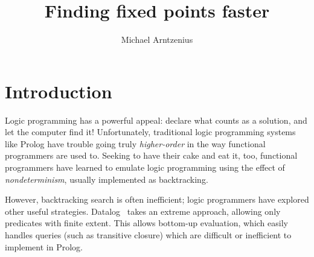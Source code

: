 \documentclass[sigplan,screen,review,timestamp,dvipsnames]{acmart}
\title{Finding fixed points faster}
\author{Michael Arntzenius}
\affiliation{University of Birmingham}
\begin{document}



\maketitle

\section{Introduction}
Logic programming has a powerful appeal: declare what counts as a solution, and
let the computer find it! Unfortunately, traditional logic programming systems
like Prolog have trouble going truly \emph{higher-order} in the way functional
programmers are used to. Seeking to have their cake and eat it, too, functional
programmers have learned to emulate logic programming using the effect of
\emph{nondeterminism}, usually implemented as backtracking.

However, backtracking search is often inefficient; logic programmers have
explored other useful strategies. Datalog~\citep{datalog} takes an extreme
approach, allowing only predicates with finite extent. This allows bottom-up
evaluation, which easily handles queries (such as transitive closure) which are
difficult or inefficient to implement in Prolog.
\end{document}
